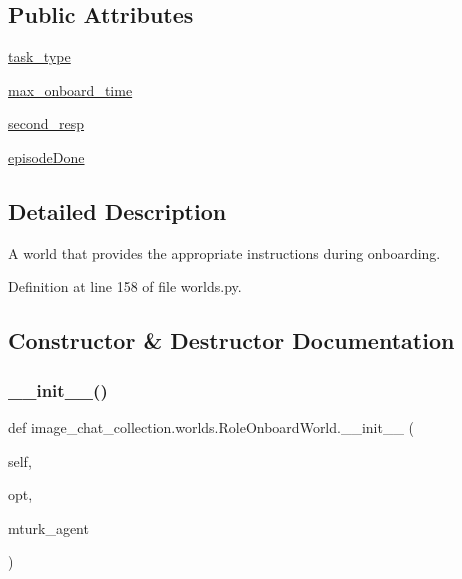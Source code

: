 \subsection*{Public Attributes}
\begin{DoxyCompactItemize}
\item 
\hyperlink{classimage__chat__collection_1_1worlds_1_1RoleOnboardWorld_ad9ed130b4de7849a205afa0d2e0881ab}{task\+\_\+type}
\item 
\hyperlink{classimage__chat__collection_1_1worlds_1_1RoleOnboardWorld_a01964521ee7db1f4fab890a88f0d1940}{max\+\_\+onboard\+\_\+time}
\item 
\hyperlink{classimage__chat__collection_1_1worlds_1_1RoleOnboardWorld_aae14ab21837d108894456e35c150f1fa}{second\+\_\+resp}
\item 
\hyperlink{classimage__chat__collection_1_1worlds_1_1RoleOnboardWorld_a5f75149b8c759e83c23b1e39ed2d5dbb}{episode\+Done}
\end{DoxyCompactItemize}


\subsection{Detailed Description}
\begin{DoxyVerb}A world that provides the appropriate instructions during onboarding.
\end{DoxyVerb}
 

Definition at line 158 of file worlds.\+py.



\subsection{Constructor \& Destructor Documentation}
\mbox{\label{classimage__chat__collection_1_1worlds_1_1RoleOnboardWorld_abc1062c3b8465f56b06b8173925d117d}} 
\subsubsection{\texorpdfstring{\+\_\+\+\_\+init\+\_\+\+\_\+()}{\_\_init\_\_()}}
{\footnotesize\ttfamily def image\+\_\+chat\+\_\+collection.\+worlds.\+Role\+Onboard\+World.\+\_\+\+\_\+init\+\_\+\+\_\+ (\begin{DoxyParamCaption}\item[{}]{self,  }\item[{}]{opt,  }\item[{}]{mturk\+\_\+agent }\end{DoxyParamCaption})}



